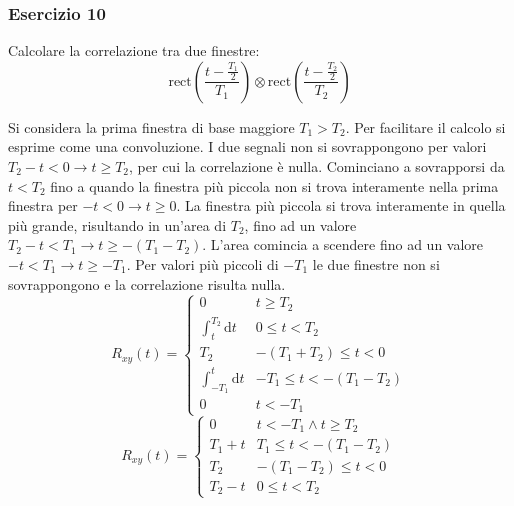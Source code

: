 \documentclass{article}
\newcommand{\rect}{\mathrm{rect}}
\newcommand{\df}{\mathrm{d}}
\begin{document}
\subsubsection*{Esercizio 10}

Calcolare la correlazione tra due finestre:
\begin{equation*}
    \rect\displaystyle\left(\frac{t-\frac{T_1}{2}}{T_1}\right)\otimes\rect\left(\frac{t-\frac{T_2}{2}}{T_2}\right)
\end{equation*}

Si considera la prima finestra di base maggiore $T_1>T_2$. Per facilitare il calcolo si esprime come una convoluzione. I due segnali non si sovrappongono per valori 
$T_2-t<0\to t\geq T_2$, per cui la correlazione è nulla. Cominciano a sovrapporsi da $t<T_2$ fino a quando la finestra più piccola non si trova interamente nella prima 
finestra per $-t<0\to t\geq0$. La finestra più piccola si trova interamente in quella più grande, risultando in un'area di $T_2$, fino ad un valore 
$T_2-t<T_1\to t\geq -(T_1-T_2)$. L'area comincia a scendere fino ad un valore $-t<T_1\to t\geq -T_1$. Per valori più piccoli di $-T_1$ le due finestre non si sovrappongono e la 
correlazione risulta nulla.
\begin{equation*}
    R_{xy}(t)=\begin{cases}
        0&t\geq T_2\\
        \displaystyle\int_t^{T_2}\df t& 0\leq t<T_2\\
        T_2& -(T_1+T_2)\leq t<0\\
        \displaystyle\int_{-T_1}^t\df t& -T_1\leq t<-(T_1-T_2)\\
        0&t<-T_1
    \end{cases}
\end{equation*}
\begin{equation}
    R_{xy}(t)=\begin{cases}
        0& t<-T_1\land t\geq T_2\\
        T_1+t& T_1\leq t<-(T_1-T_2)\\
        T_2& -(T_1-T_2)\leq t<0\\
        T_2-t &  0\leq t<T_2
    \end{cases}
\end{equation}
\end{document}
